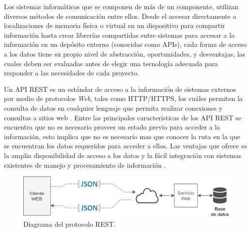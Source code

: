 


Los sistemas informáticos que se componen de más de un componente, utilizan diversos métodos de comunicación entre ellos. Desde el accesar directamente a localizaciones de memoria física o virtual en un dispositivo para compartir información hasta crear librerías compartidas entre sistemas para accesar a la información en un depósito externo (conocidas como APIs), cada forma de acceso a los datos tiene su propio nivel de abstracción, oportunidades, y desventajas, las cuales deben ser evaluadas antes de elegir una tecnología adecuada para responder a las necesidades de cada proyecto.


Un API REST es un estándar de acceso a la información de sistemas externos por medio de protocolos \textit{Web}, tales como HTTP/HTTPS, los cuáles permiten la consulta de datos en cualquier lenguaje que permita realizar conexiones y consultas a sitios web \cite{REST_API_design}. Entre las principales características de los API REST se encuentra que no es necesario proveer un estado previo para acceder a la información, esto implica que no es necesario mas que conocer la ruta en la que se encuentran los datos requeridos para acceder a ellos. Las ventajas que ofrece es la amplia disponibilidad de acceso a los datos y la fácil integración con sistemas existentes de manejo y procesamiento de información \cite{OpenAPI_example}.


\begin{figure}[!ht]
	\centering
	\includegraphics[width=.70\linewidth]{images/diagrams/REST.png}
	\caption{Diagrama del protocolo REST.}
	\label{fig:coms_nodos_raspberry}
\end{figure}


